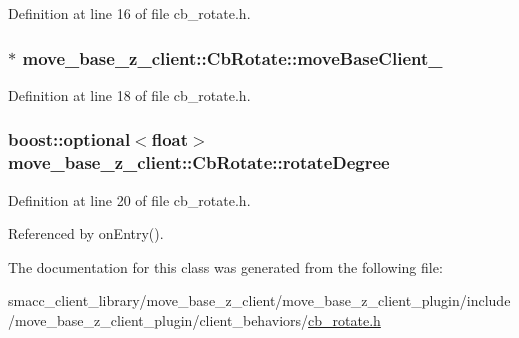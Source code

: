 Definition at line 16 of file cb\+\_\+rotate.\+h.

\subsubsection[{\texorpdfstring{move\+Base\+Client\+\_\+}{moveBaseClient_}}]{$\ast$ move\+\_\+base\+\_\+z\+\_\+client\+::\+Cb\+Rotate\+::move\+Base\+Client\+\_\+}\hypertarget{classmove__base__z__client_1_1CbRotate_a292c3739c4c1e668c0c6e241127b5c50}{}\label{classmove__base__z__client_1_1CbRotate_a292c3739c4c1e668c0c6e241127b5c50}


Definition at line 18 of file cb\+\_\+rotate.\+h.

\subsubsection[{\texorpdfstring{rotate\+Degree}{rotateDegree}}]{\setlength{\rightskip}{0pt plus 5cm}boost\+::optional$<$float$>$ move\+\_\+base\+\_\+z\+\_\+client\+::\+Cb\+Rotate\+::rotate\+Degree}\hypertarget{classmove__base__z__client_1_1CbRotate_a30d0f24b857149d78a023635562516b6}{}\label{classmove__base__z__client_1_1CbRotate_a30d0f24b857149d78a023635562516b6}


Definition at line 20 of file cb\+\_\+rotate.\+h.



Referenced by on\+Entry().



The documentation for this class was generated from the following file\+:\begin{DoxyCompactItemize}
\item 
smacc\+\_\+client\+\_\+library/move\+\_\+base\+\_\+z\+\_\+client/move\+\_\+base\+\_\+z\+\_\+client\+\_\+plugin/include/move\+\_\+base\+\_\+z\+\_\+client\+\_\+plugin/client\+\_\+behaviors/\hyperlink{cb__rotate_8h}{cb\+\_\+rotate.\+h}\end{DoxyCompactItemize}
